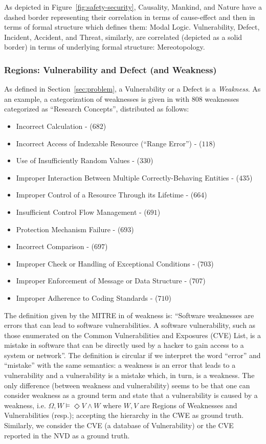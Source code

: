 \documentclass{article}
\theoremstyle{definition}
\theoremstyle{corollary}
\theoremstyle{lemma}
\theoremstyle{theorem}
\theoremstyle{theorem}
\newcommand{\World}{\Omega}
\newcommand{\Weakness}{W}
\newcommand{\Vulnerability}{V}
\begin{document}
As depicted in Figure~\ref{fig:safety-security}, Causality, Mankind, and Nature
have a dashed border representing their correlation in terms of cause-effect
and then in terms of formal structure which defines them: Modal Logic.
Vulnerability, Defect, Incident, Accident, and Threat, similarly, 
are correlated (depicted as a solid border) in terms of underlying 
formal structure: Mereotopology.

\subsubsection{Regions: Vulnerability and Defect (and Weakness)}\label{sec:vulnerabilitydefect}
As defined in Section~\ref{sec:problem}, a Vulnerability or a Defect is a
\emph{Weakness}.  As an example, a categorization of weaknesses is given
in\autocite{MITRE2020CWEresearch} with 808 weaknesses categorized as ``Research
Concepts'', distributed as follows:
\begin{itemize}[noitemsep]
	\item Incorrect Calculation - ($682$)
	\item Incorrect Access of Indexable Resource (``Range Error'') - ($118$)
	\item Use of Insufficiently Random Values - ($330$)
	\item Improper Interaction Between Multiple Correctly-Behaving Entities - ($435$)
	\item Improper Control of a Resource Through its Lifetime - ($664$)
	\item Insufficient Control Flow Management - ($691$)
	\item Protection Mechanism Failure - ($693$)
	\item Incorrect Comparison - ($697$)
	\item Improper Check or Handling of Exceptional Conditions - ($703$)
	\item Improper Enforcement of Message or Data Structure - ($707$)
	\item Improper Adherence to Coding Standards - ($710$)
\end{itemize}

The definition given by the MITRE in\autocite{MITRE2020CWEweakness} of
weakness is: ``Software weaknesses are errors that can lead to software
vulnerabilities. A software vulnerability, such as those enumerated on the
Common Vulnerabilities and Exposures (CVE) List, is a mistake in software that
can be directly used by a hacker to gain access to a system or network''.
The definition is circular if we interpret the word ``error'' and
``mistake'' with the same semantics: a weakness is an error that leads to a
vulnerability and a vulnerability is a mistake which, in turn, is a weakness.
The only difference (between weakness and vulnerability) seems to be
that one can consider weakness as a ground term and state that a
vulnerability is caused by a weakness, i.e. 
$\World,\Weakness\models\Diamond\Vulnerability\wedge\Weakness$ where
$\Weakness,\Vulnerability$ are Regions of Weaknesses and Vulnerabilities (resp.);
accepting the hierarchy in the CWE\autocite{CWE} as ground truth. 
Similarly, we consider the CVE\autocite{CVE} (a database of Vulnerability) 
or the CVE reported in the NVD as a ground truth. 
\end{document}
